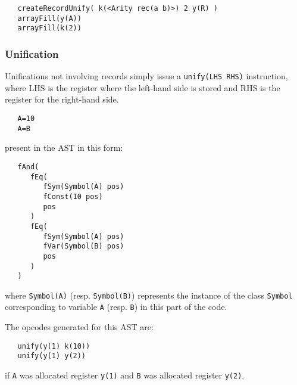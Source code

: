 \documentclass[a4paper]{memoir}
\begin{document}
\begin{lstlisting}
   createRecordUnify( k(<Arity rec(a b)>) 2 y(R) )
   arrayFill(y(A))
   arrayFill(k(2)) 
\end{lstlisting}

\subsubsection{Unification}
Unifications not involving records simply issue a \lstinline!unify(LHS RHS)! instruction, where LHS is the register where the left-hand side is stored and RHS is the register for the right-hand side.
\begin{lstlisting}
   A=10
   A=B
\end{lstlisting}
present in the AST in this form:
\begin{lstlisting}
   fAnd(
      fEq(
         fSym(Symbol(A) pos)
         fConst(10 pos)
         pos
      )
      fEq(
         fSym(Symbol(A) pos)
         fVar(Symbol(B) pos)
         pos
      )
   )
\end{lstlisting}

where \lstinline!Symbol(A)! (resp. \lstinline!Symbol(B)!) represents the instance of the class \lstinline!Symbol! corresponding to variable \lstinline!A! (resp. \lstinline!B!) in this part of the code. 

The opcodes generated for this AST are:

\begin{lstlisting}
   unify(y(1) k(10))
   unify(y(1) y(2))
\end{lstlisting}
if \lstinline!A! was allocated register \lstinline!y(1)! and \lstinline!B! was
allocated register \lstinline!y(2)!.
\end{document}
